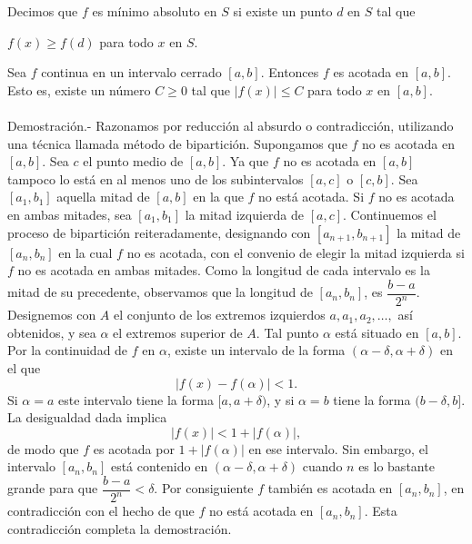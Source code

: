 \begin{tcolorbox}
    \begin{def.}
	Decimos que $f$ es mínimo absoluto en $S$ si existe un punto $d$ en $S$ tal que
	\begin{center}
	    $f(x)\geq f(d)$ para todo $x$ en $S$.
	\end{center}
    \end{def.}
\end{tcolorbox}

\begin{teo}
    Sea $f$ continua en un intervalo cerrado $[a,b]$. Entonces $f$ es acotada en $[a,b]$. Esto es, existe un número $C\geq 0$ tal que $|f(x)|\leq C$ para todo $x$ en $[a,b]$.\\\\
	Demostración.-\; Razonamos por reducción al absurdo o contradicción, utilizando una técnica llamada método de bipartición. Supongamos que $f$ no es acotada en $[a,b]$. Sea $c$ el punto medio de $[a,b]$. Ya que $f$ no es acotada en $[a,b]$ tampoco lo está en al menos uno de los subintervalos $[a,c]$ o $[c,b]$. Sea $[a_1,b_1]$ aquella mitad de $[a,b]$ en la que $f$ no está acotada. Si $f$ no es acotada en ambas mitades, sea $[a_1,b_1]$ la mitad izquierda de $[a,c]$. Continuemos el proceso de bipartición reiteradamente, designando con $[a_{n+1},b_{n+1}]$ la mitad de $[a_n,b_n]$ en la cual $f$ no es acotada, con el convenio de elegir la mitad izquierda si $f$ no es acotada en ambas mitades. Como la longitud de cada intervalo es la mitad de su precedente, observamos que la longitud de $[a_n,b_n]$, es $\dfrac{b-a}{2^n}$.\\
	Designemos con $A$ el conjunto de los extremos izquierdos $a,a_1,a_2,\ldots,$ así obtenidos, y sea $\alpha$ el extremos superior de $A$. Tal punto $\alpha$ está situado en $[a,b]$. Por la continuidad de $f$ en $\alpha$, existe un intervalo de la forma $(\alpha-\delta,\alpha+\delta)$ en el que 
	$$|f(x)-f(\alpha)|<1.$$
	Si $\alpha=a$ este intervalo tiene la forma $[a,a+\delta)$, y si $\alpha=b$ tiene la forma $(b-\delta,b]$. La desigualdad dada implica
	$$|f(x)|<1+|f(\alpha)|,$$
	de modo que $f$ es acotada por $1+|f(\alpha)|$ en ese intervalo. Sin embargo, el intervalo $[a_n,b_n]$ está contenido en $(\alpha-\delta,\alpha+\delta)$ cuando $n$ es lo bastante grande para que $\dfrac{b-a}{2^n}<\delta$. Por consiguiente $f$ también es acotada en $[a_n,b_n]$, en contradicción con el hecho de que $f$ no está acotada en $[a_n,b_n]$. Esta contradicción completa la demostración.\\\\
\end{teo}

